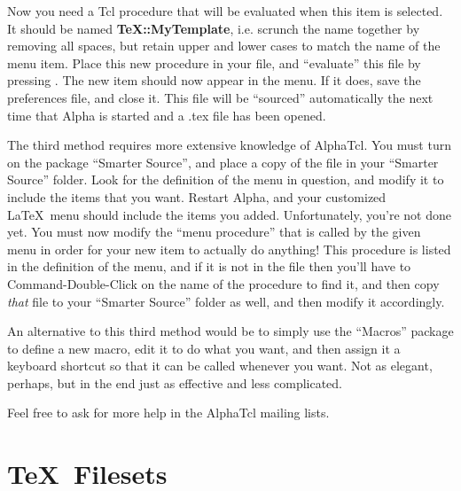 \documentclass{report}
\begin{document}
Now you need a Tcl procedure that will be evaluated when this item is
selected.  It should be named \textbf{TeX::MyTemplate}, i.e. scrunch the
name together by removing all spaces, but retain upper and lower cases
to match the name of the menu item.  Place this new procedure in your
 file, and ``evaluate'' this file by pressing
.  The new item should now appear in the menu.  If it
does, save the preferences file, and close it.  This file will be
``sourced'' automatically the next time that Alpha is started and a
.tex file has been opened.

The third method requires more extensive knowledge of AlphaTcl.  You 
must turn on the package ``Smarter Source'', and place a copy of the 
file  in your ``Smarter Source'' folder.  Look 
for the definition of the menu in question, and modify it to include 
the items that you want.  Restart Alpha, and your customized \LaTeX\ 
menu should include the items you added.  Unfortunately, you're not 
done yet.  You must now modify the ``menu procedure'' that is called by 
the given menu in order for your new item to actually do anything!  
This procedure is listed in the definition of the menu, and if it is 
not in the file \filespec{latexMenus.tcl} then you'll have to 
Command-Double-Click on the name of the procedure to find it, and then 
copy \emph{that} file to your ``Smarter Source'' folder as well, and 
then modify it accordingly.

An alternative to this third method would be to simply use the
``Macros'' package to define a new macro, edit it to do what you want,
and then assign it a keyboard shortcut so that it can be called
whenever you want.  Not as elegant, perhaps, but in the end just as 
effective and less complicated.

Feel free to ask for more help in the AlphaTcl mailing lists.

\section{\TeX\ Filesets}
\end{document}
